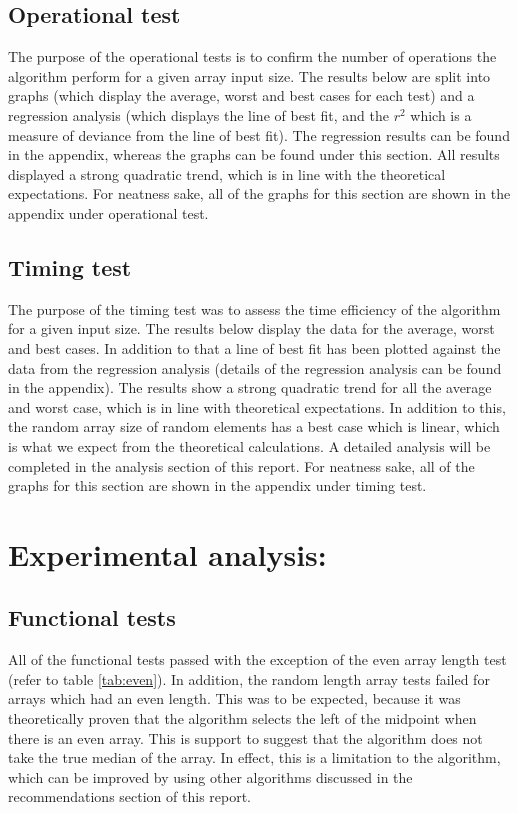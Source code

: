 \documentclass[12pt]{article}
\begin{document}
\subsection{Operational test}
The purpose of the operational tests is to confirm the number of operations the algorithm perform for a given array input size. The results below are split into graphs (which display the average, worst and best cases for each test) and a regression analysis (which displays the line of best fit, and the $r^2$ which is a measure of deviance from the line of best fit). The regression results can be found in the appendix, whereas the graphs can be found under this section. All results displayed a strong quadratic trend, which is in line with the theoretical expectations. For neatness sake, all of the graphs for this section are shown in the appendix under operational test.

\subsection{Timing test}
The purpose of the timing test was to assess the time efficiency of the algorithm for a given input size. The results below display the data for the average, worst and best cases. In addition to that a line of best fit has been plotted against the data from the regression analysis (details of the regression analysis can be found in the appendix). The results show a strong quadratic trend for all the average and worst case, which is in line with theoretical expectations. In addition to this, the random array size of random elements has a best case which is linear, which is what we expect from the theoretical calculations. A detailed analysis will be completed in the analysis section of this report. For neatness sake, all of the graphs for this section are shown in the appendix under timing test.

\section {Experimental analysis:}
\subsection{Functional tests}
All of the functional tests passed with the exception of the even array length test (refer to table \ref{tab:even}). In addition, the random length array tests failed for arrays which had an even length.  This was to be expected, because it was theoretically proven that the algorithm selects the left of the midpoint when there is an even array. This is support to suggest that the algorithm does not take the true median of the array. In effect, this is a limitation to the algorithm, which can be improved by using other algorithms discussed in the recommendations section of this report.  
\end{document}
